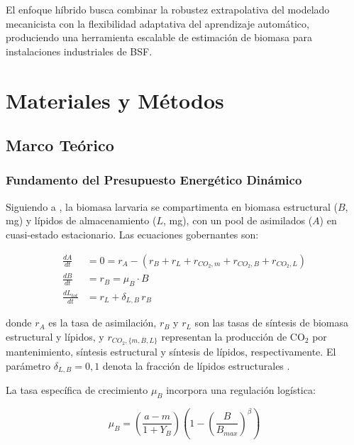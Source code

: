 \documentclass[12pt,a4paper]{article}
\begin{document}
El enfoque h\'{i}brido busca combinar la robustez extrapolativa del modelado mecanicista con la flexibilidad adaptativa del aprendizaje autom\'{a}tico, produciendo una herramienta escalable de estimaci\'{o}n de biomasa para instalaciones industriales de BSF.

\section{Materiales y M\'{e}todos}

\subsection{Marco Te\'{o}rico}

\subsubsection{Fundamento del Presupuesto Energ\'{e}tico Din\'{a}mico}

Siguiendo a \citet{eriksenDynamicModellingFeed2022}, la biomasa larvaria se compartimenta en biomasa estructural ($B$, mg) y l\'{i}pidos de almacenamiento ($L$, mg), con un pool de asimilados ($A$) en cuasi-estado estacionario. Las ecuaciones gobernantes son:

\begin{align}
    \frac{dA}{dt} &= 0 = r_A - \left(r_B + r_L + r_{CO_2,m} + r_{CO_2,B} + r_{CO_2,L}\right) \label{eq:assimilate}\\
    \frac{dB}{dt} &= r_B = \mu_B \cdot B \label{eq:structural}\\
    \frac{dL_{tot}}{dt} &= r_L + \delta_{L,B} \, r_B \label{eq:lipid}
\end{align}

donde $r_A$ es la tasa de asimilaci\'{o}n, $r_B$ y $r_L$ son las tasas de s\'{i}ntesis de biomasa estructural y l\'{i}pidos, y $r_{CO_2,\{m,B,L\}}$ representan la producci\'{o}n de CO$_2$ por mantenimiento, s\'{i}ntesis estructural y s\'{i}ntesis de l\'{i}pidos, respectivamente. El par\'{a}metro $\delta_{L,B} = 0,1$ denota la fracci\'{o}n de l\'{i}pidos estructurales \citep{eriksenDynamicModellingFeed2022}.

La tasa espec\'{i}fica de crecimiento $\mu_B$ incorpora una regulaci\'{o}n log\'{i}stica:

\begin{equation}
    \mu_B = \left(\frac{a - m}{1 + Y_B}\right)\left(1 - \left(\frac{B}{B_{max}}\right)^\beta\right) \label{eq:muB}
\end{equation}
\end{document}
